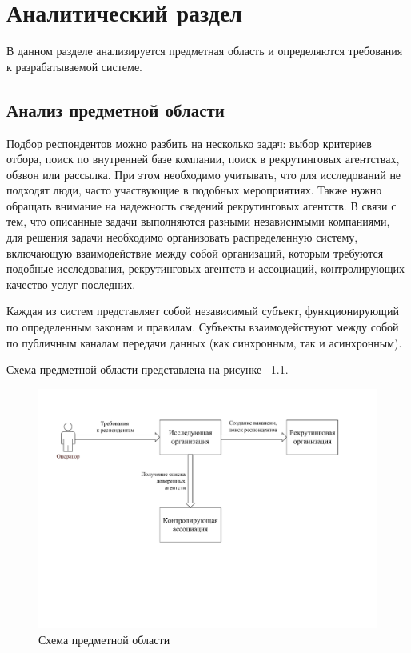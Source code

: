 \chapter{Аналитический раздел}
\label{cha:analysis}
%
%
В данном разделе анализируется предметная область и определяются требования к разрабатываемой системе.

\section{Анализ предметной области}
Подбор респондентов можно разбить на несколько задач: выбор критериев отбора, поиск по внутренней базе компании, поиск в рекрутинговых агентствах, обзвон или рассылка. При этом необходимо учитывать, что для исследований не подходят люди, часто участвующие в подобных мероприятиях. Также нужно обращать внимание на надежность сведений рекрутинговых агентств. В связи с тем, что описанные задачи выполняются разными независимыми компаниями, для решения задачи необходимо организовать распределенную систему, включающую взаимодействие между собой организаций, которым требуются подобные исследования, рекрутинговых агентств и ассоциаций, контролирующих качество услуг последних.

Каждая из систем представляет собой независимый субъект, функционирующий по определенным законам и правилам. Субъекты взаимодействуют между собой по публичным каналам передачи данных (как синхронным, так и асинхронным).

Схема предметной области представлена на рисунке ~\ref{fig:sc-obl}.

\begin{figure}[ht]
  \centering
  \includegraphics[width=\textwidth]{include/sc-obl.pdf}
  \caption{Схема предметной области}
  \label{fig:sc-obl}
\end{figure}


